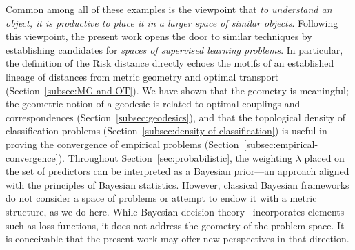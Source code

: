 \documentclass[twoside,11pt]{article}
\begin{document}
Common among all of these examples is the viewpoint that \emph{to understand an object, it is productive to place it in a larger space of similar objects}.
Following this viewpoint, the present work opens the door to similar techniques by establishing candidates for \emph{spaces of supervised learning problems}.
In particular, the definition of the Risk distance directly echoes the motifs of an established lineage of distances from metric geometry and optimal transport (Section~\ref{subsec:MG-and-OT}).
We have shown that the geometry is meaningful; the geometric notion of a geodesic is related to optimal couplings and correspondences (Section~\ref{subsec:geodesics}), and that the topological density of classification problems (Section~\ref{subsec:density-of-classification}) is useful in proving the convergence of empirical problems (Section~\ref{subsec:empirical-convergence}).
Throughout Section~\ref{sec:probabilistic}, the weighting $\lambda$ placed on the set of predictors can be interpreted as a Bayesian prior---an approach aligned with the principles of Bayesian statistics. However, classical Bayesian frameworks do not consider a space of problems or attempt to endow it with a metric structure, as we do here. While Bayesian decision theory~\citep{berger1985statistical} incorporates elements such as loss functions, it does not address the geometry of the problem space. It is conceivable that the present work may offer new perspectives in that direction.
\end{document}
